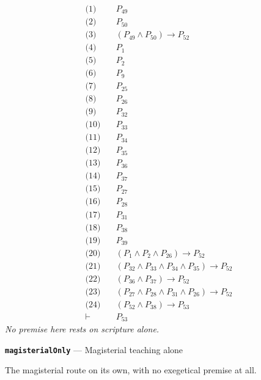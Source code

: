 \documentclass[11pt]{article}
\begin{document}
\begin{align*}
  \text{(1)} \quad & P_{49} \\
  \text{(2)} \quad & P_{50} \\
  \text{(3)} \quad & (P_{49} \land P_{50}) \rightarrow P_{52} \\
  \text{(4)} \quad & P_{1} \\
  \text{(5)} \quad & P_{2} \\
  \text{(6)} \quad & P_{9} \\
  \text{(7)} \quad & P_{25} \\
  \text{(8)} \quad & P_{26} \\
  \text{(9)} \quad & P_{32} \\
  \text{(10)} \quad & P_{33} \\
  \text{(11)} \quad & P_{34} \\
  \text{(12)} \quad & P_{35} \\
  \text{(13)} \quad & P_{36} \\
  \text{(14)} \quad & P_{37} \\
  \text{(15)} \quad & P_{27} \\
  \text{(16)} \quad & P_{28} \\
  \text{(17)} \quad & P_{31} \\
  \text{(18)} \quad & P_{38} \\
  \text{(19)} \quad & P_{39} \\
  \text{(20)} \quad & (P_{1} \land P_{2} \land P_{26}) \rightarrow P_{52} \\
  \text{(21)} \quad & (P_{32} \land P_{33} \land P_{34} \land P_{35}) \rightarrow P_{52} \\
  \text{(22)} \quad & (P_{36} \land P_{37}) \rightarrow P_{52} \\
  \text{(23)} \quad & (P_{27} \land P_{28} \land P_{31} \land P_{26}) \rightarrow P_{52} \\
  \text{(24)} \quad & (P_{52} \land P_{38}) \rightarrow P_{53} \\
  \vdash \quad & P_{53}
\end{align*}
\emph{No premise here rests on scripture alone.}
\par\medskip\noindent\textbf{\texttt{magisterial\allowbreak{}Only}} --- Magisterial teaching alone\par\nobreak\noindent
The magisterial route on its own, with no exegetical premise at all.
\end{document}
